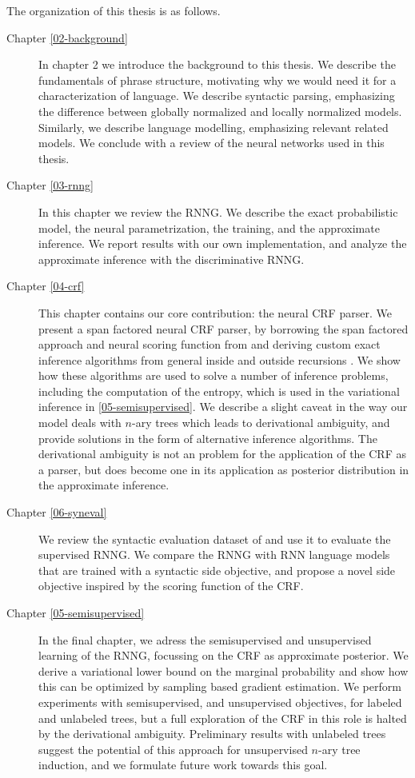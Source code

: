   The organization of this thesis is as follows.

  \begin{description}
    \item[Chapter \ref{02-background}]
      In chapter 2 we introduce the background to this thesis. We describe the fundamentals of phrase structure, motivating why we would need it for a characterization of language. We describe syntactic parsing, emphasizing the difference between globally normalized and locally normalized models. Similarly, we describe language modelling, emphasizing relevant related models. We conclude with a review of the neural networks used in this thesis.

    \item[Chapter \ref{03-rnng}]
      In this chapter we review the RNNG. We describe the exact probabilistic model, the neural parametrization, the training, and the approximate inference. We report results with our own implementation, and analyze the approximate inference with the discriminative RNNG.

    \item[Chapter \ref{04-crf}]
      This chapter contains our core contribution: the neural CRF parser. We present a span factored neural CRF parser, by borrowing the span factored approach and neural scoring function from \citet{stern2017minimal} and deriving custom exact inference algorithms from general inside and outside recursions \citep{goodman1999semiring}. We show how these algorithms are used to solve a number of inference problems, including the computation of the entropy, which is used in the variational inference in \ref{05-semisupervised}. We describe a slight caveat in the way our model deals with $n$-ary trees which leads to derivational ambiguity, and provide solutions in the form of alternative inference algorithms. The derivational ambiguity is not an problem for the application of the CRF as a parser, but does become one in its application as posterior distribution in the approximate inference.

    \item[Chapter \ref{06-syneval}]
      We review the syntactic evaluation dataset of \citep{linzen2018targeted} and use it to evaluate the supervised RNNG. We compare the RNNG with RNN language models that are trained with a syntactic side objective, and propose a novel side objective inspired by the scoring function of the CRF.

    \item[Chapter \ref{05-semisupervised}]
      In the final chapter, we adress the semisupervised and unsupervised learning of the RNNG, focussing on the CRF as approximate posterior. We derive a variational lower bound on the marginal probability and show how this can be optimized by sampling based gradient estimation. We perform experiments with semisupervised, and unsupervised objectives, for labeled and unlabeled trees, but a full exploration of the CRF in this role is halted by the derivational ambiguity. Preliminary results with unlabeled trees suggest the potential of this approach for unsupervised $n$-ary tree induction, and we formulate future work towards this goal.

  \end{description}

